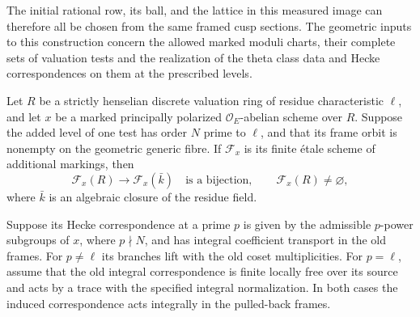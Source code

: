 The initial rational row, its ball, and the lattice in this
measured image can therefore all be chosen from the same framed
cusp sections. The geometric inputs to this construction concern
the allowed marked moduli charts, their complete sets of
valuation tests and the realization of the theta class data and
Hecke correspondences on them at the prescribed levels.

\begin{auxlemma}
\label{lem:copied-ray-level-correspondence}
Let \(R\) be a strictly henselian discrete valuation ring of
residue characteristic \(\ell\), and let \(x\) be a marked
principally polarized \(\mathcal O_E\)-abelian scheme over \(R\).
Suppose the added level of one test has order \(N\) prime to
\(\ell\), and that its frame orbit is nonempty on the geometric
generic fibre. If \(\mathcal F_x\) is its finite \'etale scheme of additional markings, then
\[
                 \mathcal F_x(R)\longrightarrow \mathcal F_x(\bar k)
                            \quad\text{is a bijection},
                 \qquad \mathcal F_x(R)\ne\varnothing ,
\]
where \(\bar k\) is an algebraic closure of the residue field.

Suppose its Hecke correspondence at a prime \(p\)
is given by the admissible \(p\)-power subgroups of \(x\), where
\(p\nmid N\), and has integral coefficient transport in the
old frames. For \(p\ne\ell\) its branches lift with the old
coset multiplicities. For \(p=\ell\), assume that the old
integral correspondence is finite locally free over its source
and acts by a trace with the specified integral normalization.
In both cases the induced correspondence acts integrally in
the pulled-back frames.
\end{auxlemma}
